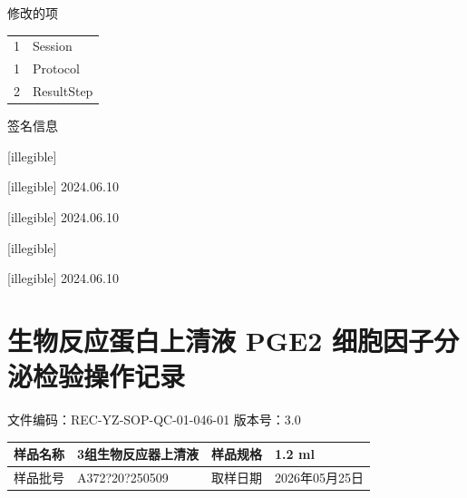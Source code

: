 \documentclass[UTF8,10pt,a4paper,fontset=fandol]{ctexart}
\newcommand{\fieldvalue}[1]{#1}
\newcommand{\handwritten}[1]{#1}
\begin{document}
\noindent 修改的项

\begin{tabular}{p{0.5cm}p{5cm}}
1 & Session\\
1 & Protocol\\
2 & ResultStep
\end{tabular}

\vspace{0.8em}

\noindent 签名信息

\vfill


\handwritten{[illegible]}

\handwritten{[illegible] 2024.06.10}

\handwritten{[illegible] 2024.06.10}

\handwritten{[illegible]}

\handwritten{[illegible] 2024.06.10}

\newpage

\section*{生物反应蛋白上清液 PGE2 细胞因子分泌检验操作记录}

\noindent
文件编码：REC-YZ-SOP-QC-01-046-01 \qquad 版本号：3.0

\begin{tabular}{|p{2.2cm}|p{5.0cm}|p{2.2cm}|p{5.0cm}|}
\hline
样品名称 &
\fieldvalue{\handwritten{3组生物反应器上清液}} &
样品规格 &
\fieldvalue{\handwritten{1.2 ml}} \\
\hline
样品批号 &
\fieldvalue{\handwritten{A372?20?250509}} &
取样日期 &
\fieldvalue{\handwritten{2026年05月25日}} \\
\hline
\end{tabular}
\end{document}
